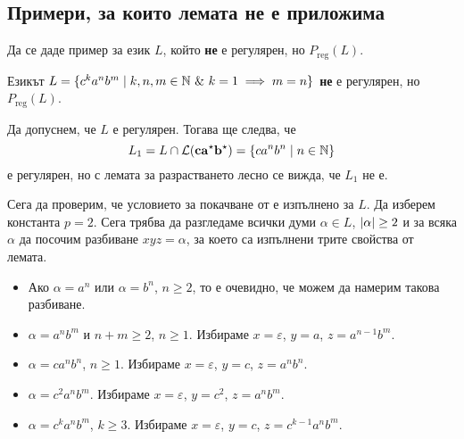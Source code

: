\subsection*{Примери, за които лемата не е  приложима}

\begin{problem}
  Да се даде пример за език $L$, който {\bf не} е регулярен, но $P_{\text{reg}}(L)$.
\end{problem}

\begin{example}
  Езикът $L = \{c^ka^nb^m\mid k,n,m \in \Nat\ \&\ k = 1\implies m = n\}$
  {\bf не} е регулярен, но $P_{\text{reg}}(L)$.
\end{example}
\begin{hint}
  Да допуснем, че $L$ е регулярен.
  Тогава ще следва, че 
  \[L_1 = L\cap \mathcal{L}(\mathbf{ca^\star b^\star}) = \{ca^nb^n \mid n\in\mathbb{N}\}\]
  е регулярен,
  но с лемата за разрастването лесно се вижда, че $L_1$ не е.

  Сега да проверим, че условието за покачване от  е изпълнено за $L$.
  Да изберем константа $p = 2$.
  Сега трябва да разгледаме всички думи $\alpha \in L$, $\vert{\alpha}\vert \geq 2$
  и за всяка $\alpha$ да посочим разбиване $xyz = \alpha$, за което са изпълнени трите свойства от лемата.

  \begin{itemize}
  \item
    Ако $\alpha = a^n$ или $\alpha = b^n$, $n\geq 2$, то е  очевидно, че можем да
    намерим такова разбиване.
  \item
    $\alpha = a^nb^m$ и $n+m \geq 2$, $n \geq 1$.
    Избираме $x = \varepsilon$, $y = a$, $z = a^{n-1}b^m$.
  \item
    $\alpha = ca^nb^n$, $n\geq 1$.
    Избираме $x = \varepsilon$, $y = c$, $z = a^nb^n$.
  \item
    $\alpha = c^2a^nb^m$. 
    Избираме $x = \varepsilon$, $y = c^2$, $z = a^nb^m$.
  \item
    $\alpha = c^ka^nb^m$, $k \geq 3$.
    Избираме $x = \varepsilon$, $y = c$, $z = c^{k-1}a^nb^m$.
  \end{itemize}
\end{hint}

